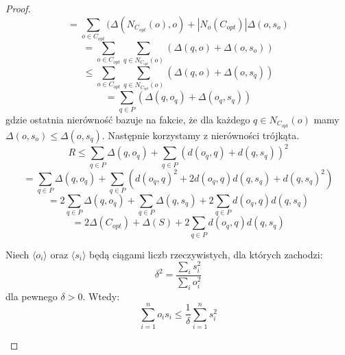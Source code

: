 \begin{proof}
\begin{equation}
    \end{equation}
    \begin{equation}
        = \sum_{o \in C_{opt}} (\Delta(N_{C_{opt}}(o), o) + |N_{o}(C_{opt})| \Delta(o, s_{o})
    \end{equation}
    \begin{equation}
        = \sum_{o \in C_{opt}} \sum_{q \in N_{C_{opt}}(o)} (\Delta(q, o) + \Delta(o, s_{o}))
    \end{equation}
    \begin{equation}
        \leq \sum_{o \in C_{opt}} \sum_{q \in N_{C_{opt}}(o)} (\Delta(q, o) + \Delta(o, s_{q}))
    \end{equation}
    \begin{equation}
        = \sum_{q \in P} (\Delta(q, o_{q}) + \Delta(o_{q}, s_{q}))
    \end{equation}
    gdzie ostatnia nierówność bazuje na fakcie, że dla każdego $q \in N_{C_{opt}}(o)$ mamy $\Delta(o, s_{o}) \leq \Delta(o, s_{q})$.
    Następnie korzystamy z nierówności trójkąta.
    \begin{equation}
        R \leq  \sum_{q \in P} \Delta(q, o_{q}) + \sum_{q \in P} ( d(o_{q}, q) + d(q, s_{q}))^{2}
    \end{equation}
    \begin{equation}
        = \sum_{q \in P} \Delta(q, o_{q}) + \sum_{q \in P} ( d(o_{q}, q)^{2} + 2d(o_{q}, q)d(q, s_{q}) + d(q, s_{q})^{2})
    \end{equation}
    \begin{equation}
        = 2\sum_{q \in P} \Delta(q, o_{q}) + \sum_{q \in P} \Delta(q, s_{q}) + 2\sum_{q \in P} d(o_{q}, q)d(q, s_{q})
    \end{equation}
    \begin{equation}
        = 2\Delta(C_{opt}) + \Delta(S) + 2\sum_{q \in P} d(o_{q}, q)d(q, s_{q})
    \end{equation}
    \begin{lemma}{\cite{Arya2004LocalSH}}
        Niech $\langle o_{i} \rangle$ oraz $\langle s_{i} \rangle$ będą ciągami liczb rzeczywistych, dla których zachodzi:
        \begin{equation}
            \delta^2 = \frac{\sum_{i} s_{i}^{2}}{\sum_{i} o_{i}^{2}}
        \end{equation}
        dla pewnego $\delta > 0$.
        Wtedy:
        \begin{equation}
            \sum_{i=1}^{n} o_{i} s_{i} \leq \frac{1}{\delta} \sum_{i=1}^{n} s_{i}^{2}
        \end{equation}

\end{lemma}
\end{proof}
